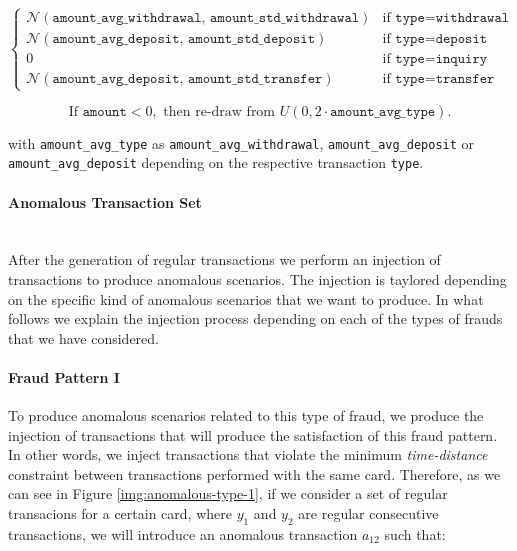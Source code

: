 \begin{enumerate}
  $$
  \begin{cases}
    \mathcal{N}(\texttt{amount\_avg\_withdrawal},\, \texttt{amount\_std\_withdrawal}) & \text{if } \texttt{type} = \texttt{withdrawal} \\[10pt]
    
    \mathcal{N}(\texttt{amount\_avg\_deposit},\, \texttt{amount\_std\_deposit}) & \text{if } \texttt{type} = \texttt{deposit} \\[10pt]

    0 & \text{if } \texttt{type} = \texttt{inquiry} \\[10pt]
    
    \mathcal{N}(\texttt{amount\_avg\_deposit},\, \texttt{amount\_std\_transfer}) & \text{if } \texttt{type} = \texttt{transfer}
  \end{cases}
  $$

  $$
  \text{If } \texttt{amount} < 0, \text{ then re-draw from } U(0, 2 \cdot \texttt{amount\_avg\_type}).
  $$

  with \texttt{amount\_avg\_type} as \texttt{amount\_avg\_withdrawal}, \texttt{amount\_avg\_deposit} or \texttt{amount\_avg\_deposit} depending on the respective transaction \texttt{type}.

\end{enumerate}

\paragraph{Anomalous Transaction Set\\\\}

After the generation of regular transactions we perform an injection of transactions to produce anomalous scenarios. The injection is taylored depending on the specific kind of 
anomalous scenarios that we want to produce. In what follows we explain the injection process depending on each of the types of frauds that we have considered.

\paragraph{Fraud Pattern I}

To produce anomalous scenarios related to this type of fraud, we produce the injection
of transactions that will produce the satisfaction of this fraud pattern. In other words,
we inject transactions that violate the minimum \emph{time-distance} constraint between transactions performed with the same card. Therefore, as we can see in Figure \ref{img:anomalous-type-1}, if we consider a set of regular transacions for a certain card, where $y_1$ and $y_2$ are regular consecutive transactions, we will introduce an anomalous transaction $a_{12}$ such that: 

